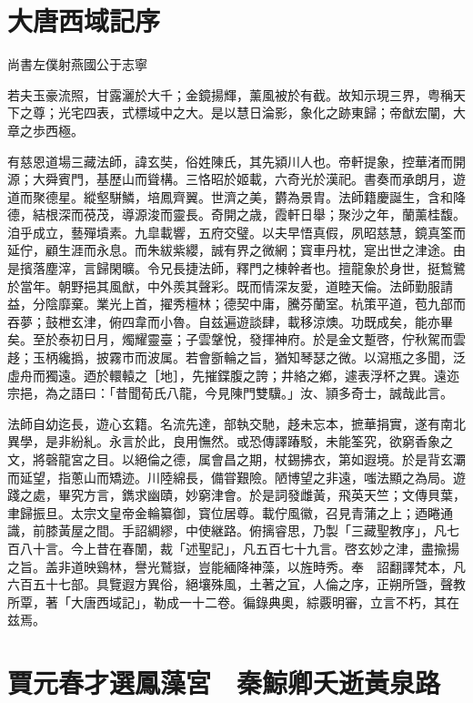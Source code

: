 \setcounter{chapter}{15}

\chapter*{大唐西域記序}

\hfill{尚書左僕射燕國公于志寧}　　

若夫玉豪流照，甘露灑於大千；金鏡揚輝，薰風被於有截。故知示現三界，粤稱天下之尊；光宅四表，式標域中之大。是以慧日淪影，象化之跡東歸；帝猷宏闡，大章之歩西極。

有慈恩道場三藏法師，諱玄奘，俗姓陳氏，其先潁川人也。帝軒提象，控華渚而開源；大舜賓門，基歴山而聳構。三恪昭於姬載，六奇光於漢祀。書奏而承朗月，遊道而聚德星。縱壑駢鱗，培鳳齊翼。世濟之美，欝為景胄。法師籍慶誕生，含和降德，結根深而䓲茂，導源浚而靈長。奇開之歳，霞軒日舉；聚沙之年，蘭薰桂馥。洎乎成立，藝殫墳素。九皐載響，五府交璧。以夫早悟真假，夙昭慈慧，鏡真筌而延佇，顧生涯而永息。而朱紱紫纓，誠有界之微網；寳車丹枕，寔出世之津途。由是擯落塵滓，言歸閑曠。令兄長捷法師，釋門之棟幹者也。擅龍象於身世，挺鶖鷺於當年。朝野挹其風猷，中外羨其聲彩。既而情深友愛，道睦天倫。法師勤服請益，分陰靡棄。業光上首，擢秀檀林；德契中庸，騰芬蘭室。杭策平道，苞九部而吞夢；鼓枻玄津，俯四韋而小魯。自兹遍遊談肆，載移涼燠。功既成矣，能亦畢矣。至於泰初日月，燭耀靈臺；子雲鞶悅，發揮神府。於是金文蹔啓，佇秋駕而雲趍；玉柄纔撝，披霧市而波属。若會斵輪之旨，猶知琴瑟之微。以瀉瓶之多聞，泛虛舟而獨遠。迺於轘轅之［地］，先摧鍱腹之誇；井絡之鄕，遽表浮杯之異。遠迩宗挹，為之語曰：「昔聞荀氏八龍，今見陳門雙驥。」汝、頴多奇士，誠哉此言。

法師自幼迄長，遊心玄籍。名流先達，部執交馳，趍未忘本，摭華捐實，遂有南北異學，是非紛糺。永言於此，良用憮然。或恐傳譯踳駁，未能筌究，欲窮香象之文，將磬龍宮之目。以絕倫之德，属會昌之期，杖錫拂衣，第如遐境。於是背玄㶚而延望，指蔥山而矯迹。川陸綿長，備甞艱險。陋博望之非遠，嗤法顯之為局。遊踐之處，畢究方言，鐫求幽賾，妙窮津會。於是詞發雌黃，飛英天竺；文傳貝葉，聿歸振旦。太宗文皇帝金輪纂御，寳位居尊。載佇風徽，召見青蒲之上；迺睠通識，前膝黃屋之間。手詔綢繆，中使継路。俯摛睿思，乃製「三藏聖教序」，凡七百八十言。今上昔在春闈，裁「述聖記」，凡五百七十九言。啓玄妙之津，盡揄揚之旨。盖非道映鷄林，譽光鷲嶽，豈能緬降神藻，以旌時秀。奉　詔翻譯梵本，凡六百五十七部。具覽遐方異俗，絕壤殊風，土著之冝，人倫之序，正朔所曁，聲教所覃，著「大唐西域記」，勒成一十二卷。徧錄典奧，綜覈明審，立言不朽，其在兹焉。

\mycleardbpage
\setcounter{chapter}{15}
\chapter{賈元春才選鳳藻宮　秦鯨卿夭逝黃泉路}

